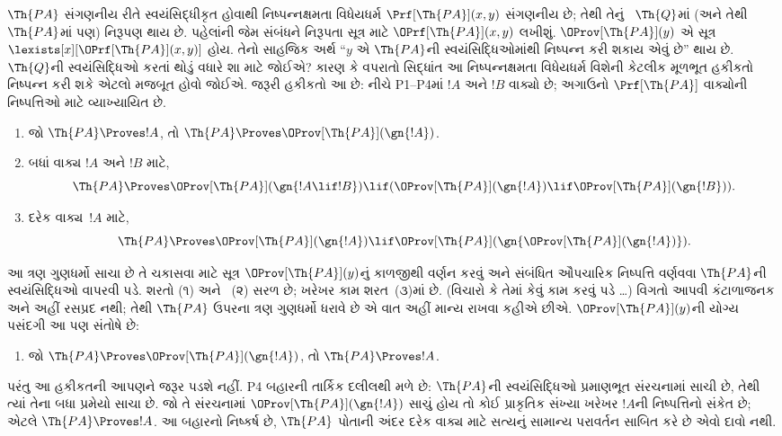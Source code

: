 $\Th{PA}$ સંગણનીય રીતે
સ્વયંસિદ્ધીકૃત હોવાથી
નિષ્પન્નક્ષમતા વિધેયધર્મ
$\Prf[\Th{PA}](x,y)$
સંગણનીય છે; તેથી તેનું
~$\Th{Q}$માં (અને તેથી
~$\Th{PA}$માં પણ)
નિરૂપણ થાય છે. પહેલાંની
જેમ સંબંધને નિરૂપતા
સૂત્ર માટે
$\OPrf[\Th{PA}](x,y)$
લખીશું. $\OProv[\Th{PA}](y)$
એ સૂત્ર
$\lexists[x][\OPrf[\Th{PA}](x,y)]$
હોય. તેનો સાહજિક અર્થ
``$y$ એ $\Th{PA}$ની
સ્વયંસિદ્ધિઓમાંથી
નિષ્પન્ન કરી શકાય એવું છે'' થાય છે.
$\Th{Q}$ની સ્વયંસિદ્ધિઓ
કરતાં થોડું વધારે
શા માટે જોઈએ?
કારણ કે વપરાતો સિદ્ધાંત
આ નિષ્પન્નક્ષમતા
વિધેયધર્મ વિશેની કેટલીક
મૂળભૂત હકીકતો
નિષ્પન્ન કરી શકે એટલો
મજબૂત હોવો જોઈએ.
જરૂરી હકીકતો આ છે:
નીચે P1--P4માં $!A$ અને $!B$ વાક્યો છે;
અગાઉનો $\Prf[\Th{PA}]$ વાક્યોની નિષ્પત્તિઓ માટે
વ્યાખ્યાયિત છે.
\begin{enumerate}
\item[P1.] જો
  $\Th{PA} \Proves !A$,
  તો $\Th{PA} \Proves
  \OProv[\Th{PA}](\gn{!A})$.
\item[P2.] બધાં
  વાક્ય $!A$ અને
  $!B$ માટે,
  \[
  \Th{PA} \Proves \OProv[\Th{PA}](\gn{!A \lif !B}) \lif
  (\OProv[\Th{PA}](\gn{!A}) \lif \OProv[\Th{PA}](\gn{!B})).
  \]
\item[P3.] દરેક
  વાક્ય~$!A$ માટે,
  \[
  \Th{PA} \Proves \OProv[\Th{PA}](\gn{!A})
  \lif \OProv[\Th{PA}](\gn{\OProv[\Th{PA}](\gn{!A})}).
  \]
\end{enumerate}
આ ત્રણ ગુણધર્મો સાચા
છે તે ચકાસવા માટે
સૂત્ર
$\OProv[\Th{PA}](y)$નું
કાળજીથી વર્ણન કરવું અને
સંબંધિત ઔપચારિક
નિષ્પત્તિ વર્ણવવા
$\Th{PA}$ની
સ્વયંસિદ્ધિઓ વાપરવી
પડે. શરતો (૧) અને
~(૨) સરળ છે; ખરેખર
કામ શરત~(૩)માં છે.
(વિચારો કે તેમાં કેવું
કામ કરવું પડે \dots)
વિગતો આપવી કંટાળાજનક
અને અહીં રસપ્રદ નથી;
તેથી $\Th{PA}$ ઉપરના
ત્રણ ગુણધર્મો ધરાવે છે
એ વાત અહીં માન્ય રાખવા
કહીએ છીએ. $\OProv[\Th{PA}](y)$ની
યોગ્ય પસંદગી આ પણ
સંતોષે છે:
\begin{enumerate}
\item[P4.] જો
  $\Th{PA} \Proves \OProv[\Th{PA}](\gn{!A})$,
  તો $\Th{PA} \Proves !A$.
\end{enumerate}
પરંતુ આ હકીકતની
આપણને જરૂર પડશે નહીં.
P4 બહારની તાર્કિક દલીલથી મળે છે: $\Th{PA}$ની
સ્વયંસિદ્ધિઓ પ્રમાણભૂત સંરચનામાં સાચી છે, તેથી ત્યાં
તેના બધા પ્રમેયો સાચા છે. જો તે સંરચનામાં
$\OProv[\Th{PA}](\gn{!A})$ સાચું હોય તો કોઈ
પ્રાકૃતિક સંખ્યા ખરેખર $!A$ની નિષ્પત્તિનો સંકેત છે;
એટલે $\Th{PA}\Proves !A$. આ બહારનો નિષ્કર્ષ છે,
$\Th{PA}$ પોતાની અંદર દરેક વાક્ય માટે સત્યનું
સામાન્ય પરાવર્તન સાબિત કરે છે એવો દાવો નથી.

